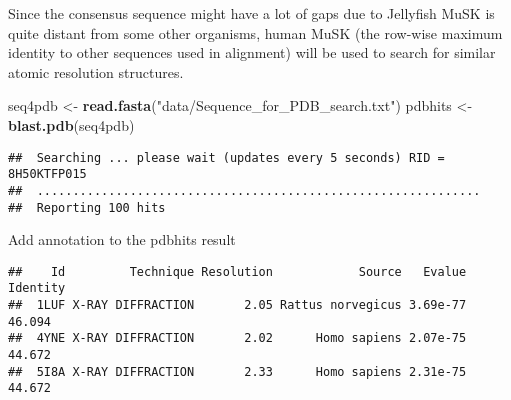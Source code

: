 \documentclass[]{article}
\newenvironment{Shaded}{\begin{snugshade}}{\end{snugshade}}
\newcommand{\KeywordTok}[1]{\textcolor[rgb]{0.13,0.29,0.53}{\textbf{#1}}}
\newcommand{\DataTypeTok}[1]{\textcolor[rgb]{0.13,0.29,0.53}{#1}}
\newcommand{\DecValTok}[1]{\textcolor[rgb]{0.00,0.00,0.81}{#1}}
\newcommand{\StringTok}[1]{\textcolor[rgb]{0.31,0.60,0.02}{#1}}
\newcommand{\OtherTok}[1]{\textcolor[rgb]{0.56,0.35,0.01}{#1}}
\newcommand{\OperatorTok}[1]{\textcolor[rgb]{0.81,0.36,0.00}{\textbf{#1}}}
\newcommand{\NormalTok}[1]{#1}
\begin{document}
Since the consensus sequence might have a lot of gaps due to Jellyfish
MuSK is quite distant from some other organisms, human MuSK (the
row-wise maximum identity to other sequences used in alignment) will be
used to search for similar atomic resolution structures.

\begin{Shaded}
\begin{Highlighting}[]
\NormalTok{seq4pdb <-}\StringTok{ }\KeywordTok{read.fasta}\NormalTok{(}\StringTok{"data/Sequence_for_PDB_search.txt"}\NormalTok{)}
\NormalTok{pdbhits <-}\StringTok{ }\KeywordTok{blast.pdb}\NormalTok{(seq4pdb)}
\end{Highlighting}
\end{Shaded}

\begin{verbatim}
##  Searching ... please wait (updates every 5 seconds) RID = 8H50KTFP015 
##  ..............................................................
##  Reporting 100 hits
\end{verbatim}

Add annotation to the pdbhits result

\begin{Shaded}
\end{Shaded}

\begin{verbatim}
##    Id         Technique Resolution            Source   Evalue Identity
##  1LUF X-RAY DIFFRACTION       2.05 Rattus norvegicus 3.69e-77   46.094
##  4YNE X-RAY DIFFRACTION       2.02      Homo sapiens 2.07e-75   44.672
##  5I8A X-RAY DIFFRACTION       2.33      Homo sapiens 2.31e-75   44.672
\end{verbatim}
\end{document}
